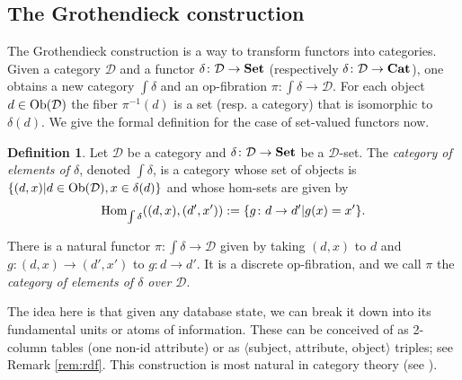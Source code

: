 \documentclass{amsart}
\newcommand{\comment}[1]{}
\def\tn{\textnormal}
\def\mc{\mathcal}
\def\Hom{\tn{Hom}}
\def\Ob{\tn{Ob}}
\def\to{\rightarrow}
\def\cross{\times}
\def\taking{\colon}
\def\m1{{-1}}
\def\op{^\tn{op}}
\def\la{\langle}
\def\ra{\rangle}
\def\Cat{{\bf Cat}}
\def\Set{{\bf Set}}
\def\mcC{\mc{C}}
\def\mcD{\mc{D}}
\theoremstyle{remark}
\newtheorem{remark}[theorem]{Remark}
\theoremstyle{definition}
\newtheorem{definition}[theorem]{Definition}
\begin{document}
\subsection{The Grothendieck construction}\label{sec:grothendieck}

The Grothendieck construction is a way to transform functors into categories.  Given a category $\mcD$ and a functor $\delta\taking\mcD\to\Set$ (respectively $\delta\taking\mcD\to\Cat$), one obtains a new category $\int\delta$ and an op-fibration $\pi\taking\int\delta\to\mcD$.  For each object $d\in\Ob(\mcD)$ the fiber $\pi^\m1(d)$ is a set (resp. a category) that is isomorphic to $\delta(d)$.  We give the formal definition for the case of set-valued functors now.

\begin{definition}

Let $\mcD$ be a category and $\delta\taking\mcD\to\Set$ be a $\mcD$-set.  The {\em category of elements of $\delta$}, denoted $\int\delta$, is a category whose set of objects is $\{(d,x) | d\in\Ob(\mcD), x\in\delta(d)\}$ and whose hom-sets are given by $$\Hom_{\int\delta}((d,x),(d',x')):=\{g\taking d\to d' | g(x) = x'\}.$$

There is a natural functor $\pi\taking\int\delta\to\mcD$ given by taking $(d,x)$ to $d$ and $g\taking(d,x)\to(d',x')$ to $g\taking d\to d'$.  It is a discrete op-fibration, and we call $\pi$ the {\em category of elements of $\delta$ over $\mcD$}.   

\end{definition}

The idea here is that given any database state, we can break it down into its fundamental units or atoms of information.  These can be conceived of as 2-column tables (one non-id attribute) or as $\la$subject, attribute, object$\ra$ triples; see Remark \ref{rem:rdf}.  This construction is most natural in category theory (see \cite[p. 44]{MM}).

\comment{%

\begin{remark}

Let $\mcC$ be a category.  There is a functor $L\taking\mcC\op\to\Cat$ given by sending an object $c$ in $\mcC$ to the slice category $\mcC_{c/}$  and the morphism $f\taking c\to c'$ in $\mcC$ to the functor $(-\circ f)\taking\mcC_{c'/}\to\mcC_{c/}$.  

Given any $\mcC$-set $\gamma\taking\mcC\to\Set$, one can compose with the inclusion $\Set\to\Cat$ which considers any set as a discrete category, and then cross with $L$ to get a functor $$(L\cross\gamma)\taking\mcC\op\cross\mcC\to\Cat.$$  The coend of this functor is the Grothendieck construction of $\gamma$.  This explains our notation $\int\delta$.

\end{remark}

}%
\end{document}
